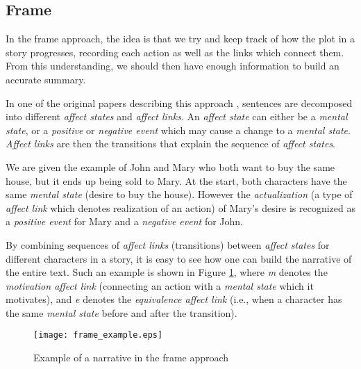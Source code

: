 
\subsection{Frame}

In the frame approach, the idea is that we try and keep track of how the plot in a story progresses, recording each action as well as the links which connect them. From this understanding, we should then have enough information to build an accurate summary.

\mbox{}

In one of the original papers describing this approach \cite{lehnert_1980_nodate}, sentences are decomposed into different \textit{affect states} and \textit{affect links}. An \textit{affect state} can either be a \textit{mental state}, or a \textit{positive} or \textit{negative event} which may cause a change to a \textit{mental state}. \textit{Affect links} are then the transitions that explain the sequence of \textit{affect states}.

We are given the example of John and Mary who both want to buy the same house, but it ends up being sold to Mary. At the start, both characters have the same \textit{mental state} (desire to buy the house). However the \textit{actualization} (a type of \textit{affect link} which denotes realization of an action) of Mary's desire is recognized as a \textit{positive event} for Mary and a \textit{negative event} for John.

By combining sequences of \textit{affect links} (transitions) between \textit{affect states} for different characters in a story, it is easy to see how one can build the narrative of the entire text. Such an example is shown in Figure \ref{fig:frame_example}, where \textit{m} denotes the \textit{motivation affect link} (connecting an action with a \textit{mental state} which it motivates), and \textit{e} denotes the \textit{equivalence affect link} (i.e., when a character has the same \textit{mental state} before and after the transition).

\begin{figure}[H]
\centering
\texttt{[image: frame\_example.eps]}
\caption{Example of a narrative in the frame approach}
\label{fig:frame_example}
\end{figure}


